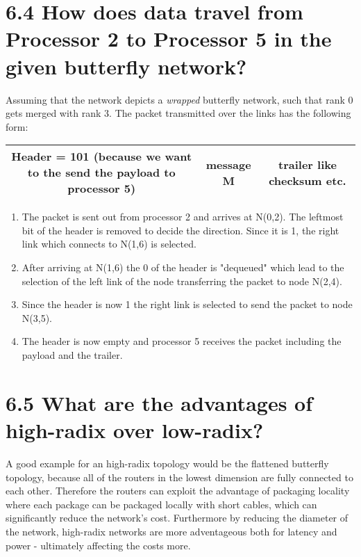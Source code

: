 \documentclass{article}
\begin{document}
	\section*{6.4 How does data travel from Processor 2 to Processor 5 in the given butterfly network?}
	\begin{adjustwidth}{2em}{2em}
		Assuming that the network depicts a \textit{wrapped} butterfly network, such that rank 0 gets merged with rank 3. The packet transmitted over the links has the following form: \\
		\begin{adjustwidth}{-4em}{}
			\begin{tabular}{|c|c|c|}
				\hline
				Header = 101 (because we want to the send the payload to processor 5) & message M & trailer like checksum etc. \\
				\hline
			\end{tabular}
		\end{adjustwidth}
		\begin{enumerate}[\small \textbullet]
			\item The packet is sent out from processor 2 and arrives at N(0,2). The leftmost bit of the header is removed to decide the direction. Since it is 1, the right link which connects to N(1,6) is selected.
			\item After arriving at N(1,6) the 0 of the header is "dequeued" which lead to the selection of the left link of the node transferring the packet to node N(2,4).
			\item Since the header is now 1 the right link is selected to send the packet to node N(3,5).
			\item The header is now empty and processor 5 receives the packet including the payload and the trailer.
		\end{enumerate}
	\end{adjustwidth}
	
	\section*{6.5 What are the advantages of high-radix over low-radix?}
	\begin{adjustwidth}{2em}{2em}
		A good example for an high-radix topology would be the flattened butterfly topology, because all of the routers in the lowest dimension are fully connected to each other. Therefore the routers can exploit the advantage of packaging locality where each package can be packaged locally with short cables, which can significantly reduce the network's cost. Furthermore by reducing the diameter of the network, high-radix networks are more adventageous both for latency and power - ultimately affecting the costs more.
	\end{adjustwidth}
	
\end{document}
